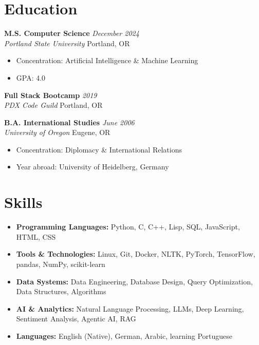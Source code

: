 \documentclass[letterpaper,11pt]{article}
\newcommand{\entry}[4]{
  \vspace{0.1em}
  \noindent\textbf{#1} \hfill \textit{#2}
  \\ \textit{#3} \hfill #4
  \vspace{0.3em}
}
\newcommand{\achievement}[1]{
  \vspace{-.5em}
  \item #1
}
\begin{document}
\section{Education}

\entry{M.S. Computer Science}{December 2024}{Portland State University}{Portland, OR}
\vspace{-.1cm}
\begin{itemize}[leftmargin=*]
  \achievement{Concentration: Artificial Intelligence \& Machine Learning}
  \achievement{GPA: 4.0}
\end{itemize}

\entry{Full Stack Bootcamp}{2019}{PDX Code Guild}{Portland, OR}

\entry{B.A. International Studies}{June 2006}{University of Oregon}{Eugene, OR}
\vspace{-.1cm}
\begin{itemize}[leftmargin=*]
  \achievement{Concentration: Diplomacy \& International Relations}
  \achievement{Year abroad: University of Heidelberg, Germany}
\end{itemize}

\section{Skills}
\begin{itemize}[leftmargin=*, itemsep=-0.2em]
  \item \textbf{Programming Languages:} Python, C, C++, Lisp, SQL, JavaScript, HTML, CSS
  \item \textbf{Tools \& Technologies:} Linux, Git, Docker, NLTK, PyTorch, TensorFlow, pandas, NumPy, scikit-learn
  \item \textbf{Data Systems:} Data Engineering, Database Design, Query Optimization, Data Structures, Algorithms
  \item \textbf{AI \& Analytics:} Natural Language Processing, LLMs, Deep Learning, Sentiment Analysis, Agentic AI, RAG
  \item \textbf{Languages:} English (Native), German, Arabic, learning Portuguese
\end{itemize}
 
\end{document}
